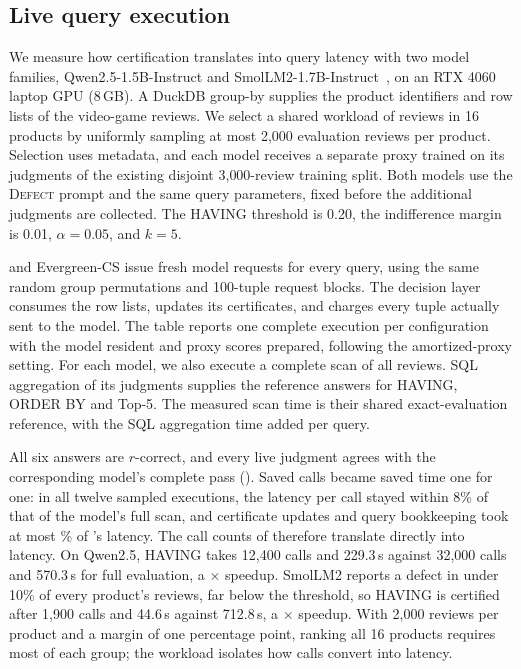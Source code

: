 \subsection{Live query execution}
\label{sec:live}

We measure how certification translates into query latency with two model families,
Qwen2.5-1.5B-Instruct and SmolLM2-1.7B-Instruct~\cite{smollm2}, on an RTX 4060 laptop GPU (8\,GB).
A DuckDB group-by supplies the product identifiers and row lists of the video-game reviews.
We select a shared workload of \numLiveN{} reviews in 16 products by uniformly sampling at most 2{,}000 evaluation reviews per product.
Selection uses metadata, and each model receives a separate proxy trained on its judgments of the existing disjoint 3{,}000-review training split.
Both models use the \textsc{Defect} prompt and the same query parameters, fixed before the additional judgments are collected.
The HAVING threshold is 0.20, the indifference margin is 0.01, $\alpha=0.05$, and $k=5$.



\sys{} and Evergreen-CS issue fresh model requests for every query, using the same random group permutations and 100-tuple request blocks.
The decision layer consumes the row lists, updates its certificates, and charges every tuple actually sent to the model.
The table reports one complete execution per configuration with the model resident and proxy scores prepared, following the amortized-proxy setting.
For each model, we also execute a complete scan of all \numLiveN{} reviews.
SQL aggregation of its judgments supplies the reference answers for HAVING, ORDER BY and Top-5.
The measured scan time is their shared exact-evaluation reference, with the SQL aggregation time added per query.

All six \sys{} answers are $r$-correct, and every live judgment agrees with the corresponding model's complete pass ().
Saved calls became saved time one for one: in all twelve sampled executions, the latency per call stayed within 8\% of that of the model's full scan, and certificate updates and query bookkeeping took at most \numLiveMaxOverhead\% of \sys{}'s latency.
The call counts of  therefore translate directly into latency.
On Qwen2.5, HAVING takes 12{,}400 calls and 229.3\,s against 32{,}000 calls and 570.3\,s for full evaluation, a \numLiveHavingMin$\times$ speedup.
SmolLM2 reports a defect in under 10\% of every product's reviews, far below the threshold, so HAVING is certified after 1{,}900 calls and 44.6\,s against 712.8\,s, a \numLiveHavingMax$\times$ speedup.
With 2{,}000 reviews per product and a margin of one percentage point, ranking all 16 products requires most of each group; the workload isolates how calls convert into latency.

